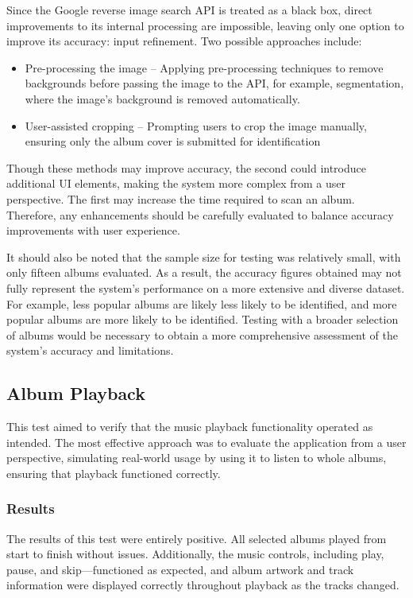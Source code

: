 Since the Google reverse image search API is treated as a black box, direct improvements to its internal processing are impossible, leaving only one option to improve its accuracy: input refinement. Two possible approaches include:

\begin{itemize}
    \item Pre-processing the image – Applying pre-processing techniques to remove backgrounds before passing the image to the API, for example, segmentation, where the image's background is removed automatically. %
    \item User-assisted cropping – Prompting users to crop the image manually, ensuring only the album cover is submitted for identification
\end{itemize}

Though these methods may improve accuracy, the second could introduce additional UI elements, making the system more complex from a user perspective. The first may increase the time required to scan an album. Therefore, any enhancements should be carefully evaluated to balance accuracy improvements with user experience.

It should also be noted that the sample size for testing was relatively small, with only fifteen albums evaluated. As a result, the accuracy figures obtained may not fully represent the system's performance on a more extensive and diverse dataset. For example, less popular albums are likely less likely to be identified, and more popular albums are more likely to be identified. Testing with a broader selection of albums would be necessary to obtain a more comprehensive assessment of the system's accuracy and limitations.

\subsection{Album Playback}
This test aimed to verify that the music playback functionality operated as intended. The most effective approach was to evaluate the application from a user perspective, simulating real-world usage by using it to listen to whole albums, ensuring that playback functioned correctly.
\ifshowappendix
\fi

\subsubsection{Results}
The results of this test were entirely positive. All selected albums played from start to finish without issues. Additionally, the music controls, including play, pause, and skip—functioned as expected, and album artwork and track information were displayed correctly throughout playback as the tracks changed.

